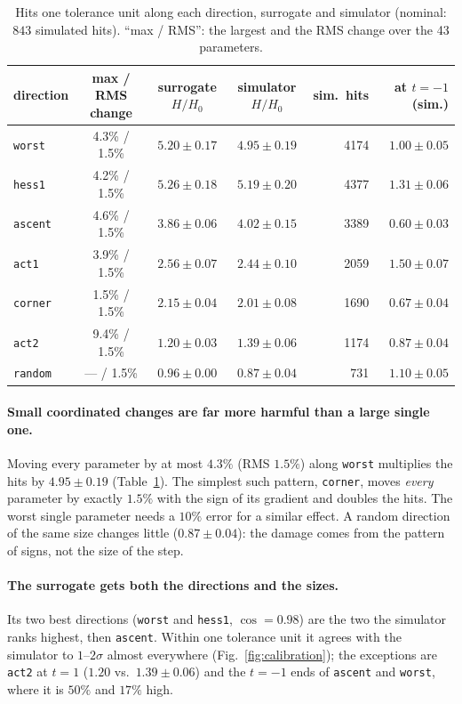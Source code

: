 \documentclass[11pt,a4paper]{article}
\newcommand{\HH}{H/H_0}
\begin{document}
\begin{table}[t]
\centering
\caption{Hits one tolerance unit along each direction, surrogate and simulator (nominal: $843$
simulated hits). ``max / RMS'': the largest and the RMS change over the 43 parameters.}
\label{tab:walks}
\begin{tabular}{lcccrr}
\toprule
direction & max / RMS change & surrogate $\HH$ & simulator $\HH$ & sim.\ hits & at $t=-1$ (sim.) \\
\midrule
\texttt{worst}  & 4.3\% / 1.5\% & $5.20\pm0.17$ & $4.95\pm0.19$ & 4174 & $1.00\pm0.05$ \\
\texttt{hess1}  & 4.2\% / 1.5\% & $5.26\pm0.18$ & $5.19\pm0.20$ & 4377 & $1.31\pm0.06$ \\
\texttt{ascent} & 4.6\% / 1.5\% & $3.86\pm0.06$ & $4.02\pm0.15$ & 3389 & $0.60\pm0.03$ \\
\texttt{act1}   & 3.9\% / 1.5\% & $2.56\pm0.07$ & $2.44\pm0.10$ & 2059 & $1.50\pm0.07$ \\
\texttt{corner} & 1.5\% / 1.5\% & $2.15\pm0.04$ & $2.01\pm0.08$ & 1690 & $0.67\pm0.04$ \\
\texttt{act2}   & 9.4\% / 1.5\% & $1.20\pm0.03$ & $1.39\pm0.06$ & 1174 & $0.87\pm0.04$ \\
\texttt{random} & ---  / 1.5\% & $0.96\pm0.00$ & $0.87\pm0.04$ &  731 & $1.10\pm0.05$ \\
\bottomrule
\end{tabular}
\end{table}

\paragraph{Small coordinated changes are far more harmful than a large single one.}
Moving every parameter by at most $4.3\%$ (RMS $1.5\%$) along \texttt{worst} multiplies the hits
by $4.95\pm0.19$ (Table~\ref{tab:walks}). The simplest such pattern, \texttt{corner}, moves
\emph{every} parameter by exactly $1.5\%$ with the sign of its gradient and doubles the hits. The
worst single parameter needs a $10\%$ error for a similar effect. A random direction of the same
size changes little ($0.87\pm0.04$): the damage comes from the pattern of signs, not the size of
the step.

\paragraph{The surrogate gets both the directions and the sizes.}
Its two best directions (\texttt{worst} and \texttt{hess1}, $\cos=0.98$) are the two the
simulator ranks highest, then \texttt{ascent}. Within one tolerance unit it agrees with the
simulator to $1$--$2\sigma$ almost everywhere (Fig.~\ref{fig:calibration}); the exceptions are
\texttt{act2} at $t=1$ ($1.20$ vs.\ $1.39\pm0.06$) and the $t=-1$ ends of \texttt{ascent} and
\texttt{worst}, where it is $50\%$ and $17\%$ high.
\end{document}
